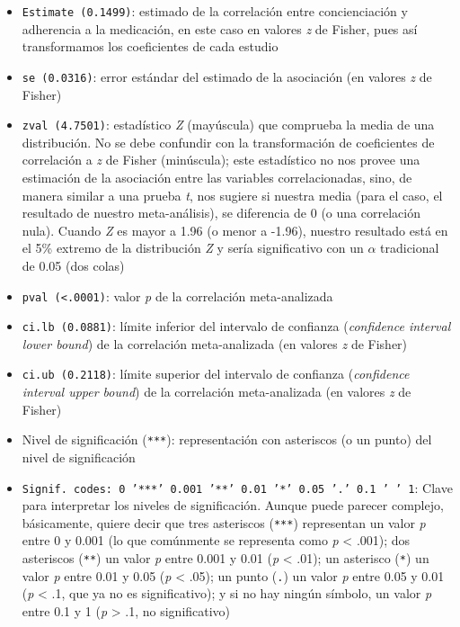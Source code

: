 \documentclass[
  bookmarksnumbered]{article}
\begin{document}
\begin{itemize}
\item
  \texttt{Estimate\ (0.1499)}: estimado de la correlación entre concienciación y adherencia a la medicación, en este caso en valores \emph{z} de Fisher, pues así transformamos los coeficientes de cada estudio
\item
  \texttt{se\ (0.0316)}: error estándar del estimado de la asociación (en valores \emph{z} de Fisher)
\item
  \texttt{zval\ (4.7501)}: estadístico \emph{Z} (mayúscula) que comprueba la media de una distribución. No se debe confundir con la transformación de coeficientes de correlación a \emph{z} de Fisher (minúscula); este estadístico no nos provee una estimación de la asociación entre las variables correlacionadas, sino, de manera similar a una prueba \emph{t}, nos sugiere si nuestra media (para el caso, el resultado de nuestro meta-análisis), se diferencia de 0 (o una correlación nula). Cuando \emph{Z} es mayor a 1.96 (o menor a -1.96), nuestro resultado está en el 5\% extremo de la distribución \emph{Z} y sería significativo con un \(\alpha\) tradicional de 0.05 (dos colas)
\item
  \texttt{pval\ (\textless{}.0001)}: valor \emph{p} de la correlación meta-analizada
\item
  \texttt{ci.lb\ (0.0881)}: límite inferior del intervalo de confianza (\emph{confidence interval lower bound}) de la correlación meta-analizada (en valores \emph{z} de Fisher)
\item
  \texttt{ci.ub\ (0.2118)}: límite superior del intervalo de confianza (\emph{confidence interval upper bound}) de la correlación meta-analizada (en valores \emph{z} de Fisher)
\item
  Nivel de significación (\texttt{***}): representación con asteriscos (o un punto) del nivel de significación
\item
  \texttt{Signif.\ codes:\ 0\ ’***’\ 0.001\ ’**’\ 0.01\ ’*’\ 0.05\ ’.’\ 0.1\ ’\ ’\ 1}: Clave para interpretar los niveles de significación. Aunque puede parecer complejo, básicamente, quiere decir que tres asteriscos (\texttt{***}) representan un valor \emph{p} entre 0 y 0.001 (lo que comúnmente se representa como \emph{p} \textless{} .001); dos asteriscos (\texttt{**}) un valor \emph{p} entre 0.001 y 0.01 (\emph{p} \textless{} .01); un asterisco (\texttt{*}) un valor \emph{p} entre 0.01 y 0.05 (\emph{p} \textless{} .05); un punto (\texttt{.}) un valor \emph{p} entre 0.05 y 0.01 (\emph{p} \textless{} .1, que ya no es significativo); y si no hay ningún símbolo, un valor \emph{p} entre 0.1 y 1 (\emph{p} \textgreater{} .1, no significativo)
\end{itemize}
\end{document}
